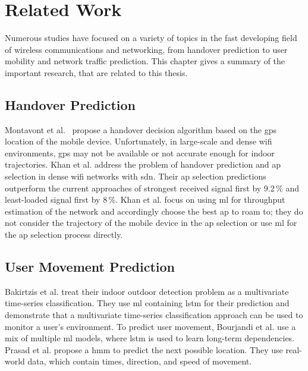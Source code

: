 \chapter{Related Work}\label{ch:related-work}

Numerous studies have focused on a variety of topics in the fast developing field of wireless communications and networking, from handover prediction to user mobility and network traffic prediction.
This chapter gives a summary of the important research, that are related to this thesis.



\section{Handover Prediction}

Montavont et al.~\cite{handover-assisted-by-gps} propose a handover decision algorithm based on the \ac{gps} location of the mobile device.
Unfortunately, in large-scale and dense \ac{wifi} environments, \ac{gps} may not be available or not accurate enough for indoor trajectories.
Khan et al. \cite{MLBasedHandoverPrediction2022} address the problem of handover prediction and \ac{ap} selection in dense \ac{wifi} networks with \ac{sdn}.
Their \ac{ap} selection predictions outperform the current approaches of strongest received signal first by 9.2\,\%  and least-loaded signal first by 8\,\%.
Khan et al. focus on using \ac{ml} for throughput estimation of the network and accordingly choose the best \ac{ap} to roam to; they do not consider the trajectory of the mobile device in the \ac{ap} selection or use \ac{ml} for the \ac{ap} selection process directly.

\section{User Movement Prediction}

Bakirtzis et al. \cite{multivariate-lstm-indoor-outdoor} treat their indoor outdoor detection problem as a multivariate time-series classification.
They use \ac{ml} containing \ac{lstm} for their prediction and demonstrate that a multivariate time-series classification approach can be used to monitor a user's environment.
To predict user movement, Bourjandi et al. \cite{bourjandiPredictingUserMovement2022} use a mix of multiple \ac{ml} models, where \ac{lstm} is used to learn long-term dependencies.
Prasad et al. \cite{hmm-movement-prediction} propose a \ac{hmm} to predict the next possible location.
They use real-world data, which contain times, direction, and speed of movement.

